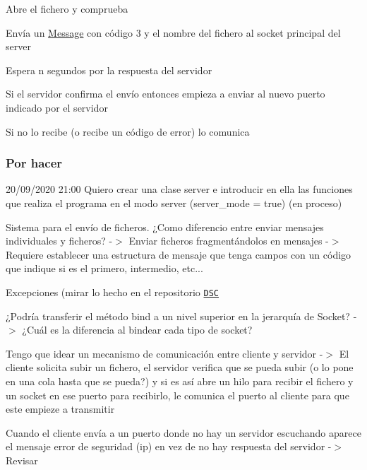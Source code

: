 \begin{DoxyEnumerate}
\item Abre el fichero y comprueba
\item Envía un \hyperlink{structMessage}{Message} con código 3 y el nombre del fichero al socket principal del server
\item Espera n segundos por la respuesta del servidor
\item 
\begin{DoxyItemize}
\item Si el servidor confirma el envío entonces empieza a enviar al nuevo puerto indicado por el servidor
\item Si no lo recibe (o recibe un código de error) lo comunica
\end{DoxyItemize}
\end{DoxyEnumerate}

\subsubsection*{Por hacer}


\begin{DoxyItemize}
\item 20/09/2020 21\+:00 Quiero crear una clase server e introducir en ella las funciones que realiza el programa en el modo server (server\+\_\+mode = true) (en proceso)
\item Sistema para el envío de ficheros. ¿\+Como diferencio entre enviar mensajes individuales y ficheros? -\/$>$ Enviar ficheros fragmentándolos en mensajes -\/$>$ Requiere establecer una estructura de mensaje que tenga campos con un código que indique si es el primero, intermedio, etc...
\item Excepciones (mirar lo hecho en el repositorio \href{https://github.com/miguel-martinr/Data-Structure-Classes}{\tt D\+SC}
\item ¿\+Podría transferir el método bind a un nivel superior en la jerarquía de Socket? -\/$>$ ¿\+Cuál es la diferencia al bindear cada tipo de socket?
\item Tengo que idear un mecanismo de comunicación entre cliente y servidor -\/$>$ El cliente solicita subir un fichero, el servidor verifica que se pueda subir (o lo pone en una cola hasta que se pueda?) y si es así abre un hilo para recibir el fichero y un socket en ese puerto para recibirlo, le comunica el puerto al cliente para que este empieze a transmitir
\item Cuando el cliente envía a un puerto donde no hay un servidor escuchando aparece el mensaje error de seguridad (ip) en vez de no hay respuesta del servidor -\/$>$ Revisar
\end{DoxyItemize}

